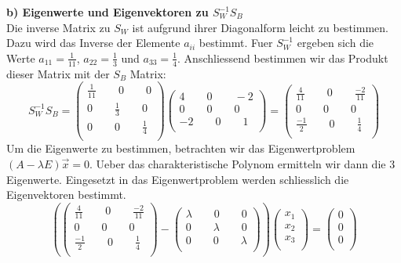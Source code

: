\documentclass{article}
\begin{document}
\textbf{b) Eigenwerte und Eigenvektoren zu $S_W^{-1}S_B$} \\
Die inverse Matrix zu $S_W$ ist aufgrund ihrer Diagonalform leicht zu bestimmen. 
Dazu wird das Inverse der Elemente $a_{ii}$ bestimmt. Fuer $S_W^{-1}$ ergeben sich die Werte
$a_{11} = \frac{1}{11}$, $a_{22} = \frac{1}{3}$ und $a_{33} = \frac{1}{4}$.
Anschliessend bestimmen wir das Produkt dieser Matrix mit der $S_B$ Matrix:
\[
S_W^{-1}S_B =
\left(
\begin {array} {c}
\frac{1}{11} \qquad 0 \qquad 0  \\
0 \qquad \frac{1}{3} \qquad 0  \\
0 \qquad 0 \qquad \frac{1}{4}  \\
\end {array}
\right)
\left(
\begin {array} {c}
4 \qquad 0 \qquad -2  \\
0 \qquad 0 \qquad 0  \\
-2 \qquad 0 \qquad 1  \\
\end {array}
\right)
=
\left(
\begin {array} {c}
\frac{4}{11} \qquad 0 \qquad \frac{-2}{11}  \\
0 \qquad 0 \qquad 0  \\
\frac{-1}{2} \qquad 0 \qquad \frac{1}{4}  \\
\end {array}
\right)
\]
Um die Eigenwerte zu bestimmen, betrachten wir das Eigenwertproblem $(A - \lambda E) \vec{x} = 0$.
Ueber das charakteristische Polynom ermitteln wir dann die 3 Eigenwerte. Eingesetzt in
das Eigenwertproblem werden schliesslich die Eigenvektoren bestimmt.
\[
\left(
\left(
\begin {array} {c}
\frac{4}{11} \qquad 0 \qquad \frac{-2}{11}  \\
0 \qquad 0 \qquad 0  \\
\frac{-1}{2} \qquad 0 \qquad \frac{1}{4}  \\
\end {array}
\right)
-
\left(
\begin {array} {c}
\lambda \qquad 0 \qquad 0  \\
0 \qquad \lambda \qquad 0  \\
0 \qquad 0 \qquad \lambda  \\
\end {array}
\right)
\right)
\left(
\begin {array} {c}
x_1  \\
x_2  \\
x_3  \\
\end {array}
\right)
=
\left(
\begin {array} {c}
0  \\
0  \\
0  \\
\end {array}
\right)
\]
\end{document}
